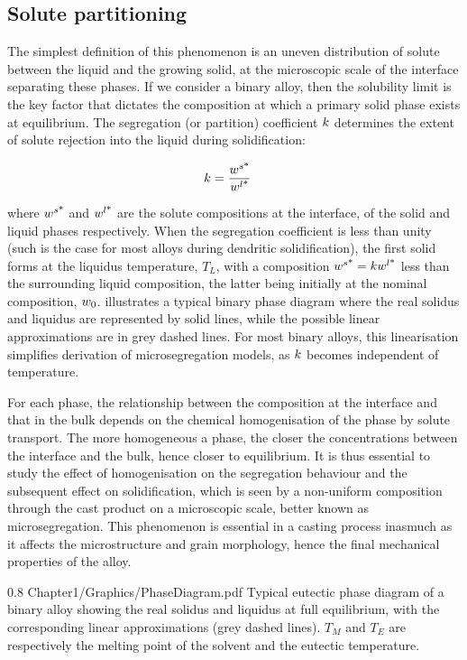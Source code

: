 \subsection{Solute partitioning}
The simplest definition of this phenomenon is an uneven distribution of solute between the liquid and the growing solid, at the microscopic scale
of the interface separating these phases. If we consider a binary alloy, then the solubility limit is 
the key factor that dictates the composition at which a primary solid phase exists at equilibrium. 
The segregation (or partition) coefficient $k$ determines the extent of solute rejection into the liquid during solidification:

\begin{align}
\label{eq:partition}
& k = \frac{{w}^{s \text{*}} }{{w}^{l \text{*}} }
\end{align}

where ${w}^{s \text{*}} $ and ${w}^{l \text{*}} $ are the solute compositions at the interface, of the solid and liquid phases respectively. When the 
segregation coefficient is less than unity (such is the case for most alloys during dendritic solidification), 
the first solid forms at the liquidus temperature, $T_L$, with a composition ${w}^{s \text{*}} =k {w}^{l \text{*}} $ less than the surrounding liquid 
composition, the latter being initially at the nominal composition, ${w}_0$.  illustrates a typical binary 
phase diagram where the real solidus and liquidus are represented by solid lines, while the possible linear approximations are in grey dashed lines.
For most binary alloys, this linearisation simplifies derivation of microsegregation models, as $k$ becomes independent of temperature.

For each phase, the relationship between the composition at the interface and that in the bulk depends on the chemical homogenisation of the phase by solute transport.
The more homogeneous a phase, the closer the concentrations between the interface and the bulk, hence closer to equilibrium.
It is thus essential to study the effect of homogenisation on the segregation behaviour and the subsequent effect on solidification, 
which is seen by a non-uniform composition through the cast product on a microscopic scale, better known as microsegregation.
This phenomenon is essential in a casting process inasmuch as it affects the microstructure and grain morphology, hence the final
mechanical properties of the alloy.
\begin{figureth}
{0.8}
{Chapter1/Graphics/PhaseDiagram.pdf}
{Typical eutectic phase diagram of a binary alloy showing the real solidus and liquidus at full equilibrium,
with the corresponding linear approximations (grey dashed lines). $T_M$ and $T_E$ are respectively the melting point
of the solvent and the eutectic temperature.}
\label{fig:binary_diag}
\end{figureth}
%
